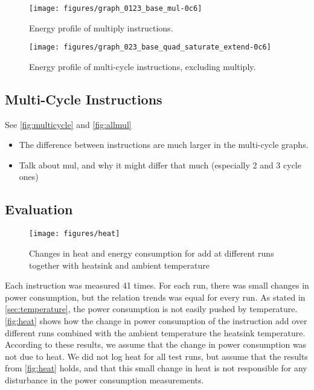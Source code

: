 \begin{figure*}
    \centering
    \texttt{[image: figures/graph\_0123\_base\_mul-0c6]}
    \caption{Energy profile of multiply instructions.}
    \label{fig:allmul}
\end{figure*}

\begin{figure}
    \centering
    \texttt{[image: figures/graph\_023\_base\_quad\_saturate\_extend-0c6]}
    \caption{Energy profile of multi-cycle instructions, excluding multiply.}
    \label{fig:multicycle}
\end{figure}


\subsection{Multi-Cycle Instructions}

See \autoref{fig:multicycle} and \autoref{fig:allmul}
\begin{itemize}
    \item The difference between instructions are much larger in the multi-cycle
        graphs.
    \item Talk about mul, and why it might differ that much (especially 2 and 3 cycle ones)
\end{itemize}

\subsection{Evaluation}
\begin{figure}
    \centering
    \texttt{[image: figures/heat]}
    \caption{Changes in heat and energy consumption for {\ttfamily add} at different runs together with heatsink and ambient temperature}
    \label{fig:heat}
\end{figure}

Each instruction was measured 41 times. For each run, there was small changes in
power consumption, but the relation trends was equal for every run.
As stated in \autoref{sec:temperature}, the power consumption is not easily pushed by temperature. \autoref{fig:heat} shows how the change in power consumption of the instruction
{\ttfamily add} over different runs combined with the ambient temperature the
heatsink temperature. According to these results, we assume that the change in
power consumption was not due to heat. We did not log heat for all test runs,
but assume that the results from \autoref{fig:heat} holds, and that this small
change in heat is not responsible for any disturbance in the power consumption
measurements.


